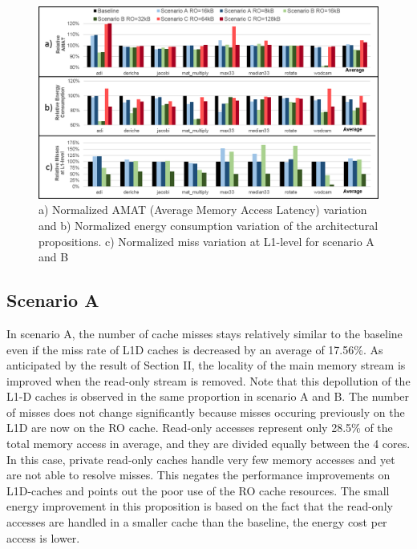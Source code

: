 \documentclass[sigconf]{acmart}
\begin{document}
\begin{figure}
    \centering
    \includegraphics[width=15cm]{./images/results.png}
    \caption{a) Normalized AMAT (Average Memory Access Latency) variation and b) Normalized energy consumption variation of the architectural propositions. c) Normalized miss variation at L1-level for scenario A and B}
    \label{results}
\end{figure}


\subsection{Scenario A}

In scenario A, the number of cache misses stays relatively similar to the baseline even if the miss rate of L1D caches is decreased by an average of 17.56\%. As anticipated by the result of Section II, the locality of the main memory stream is improved when the read-only stream is removed. Note that this depollution of the L1-D caches is observed in the same proportion in scenario A and B. The number of misses does not change significantly because misses occuring previously on the L1D are now on the RO cache. Read-only accesses represent only 28.5\% of the total memory access in average, and they are divided equally between the 4 cores. In this case, private read-only caches handle very few memory accesses and yet are not able to resolve misses. This negates the performance improvements on L1D-caches and points out the poor use of the RO cache resources. The small energy improvement in this proposition is based on the fact that the read-only accesses are handled in a smaller cache than the baseline, the energy cost per access is lower.
\end{document}
